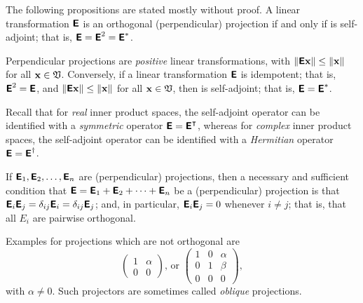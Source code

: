 The following propositions are stated mostly without proof.
A  linear transformation $\textsf{\textbf{E}}$ is an orthogonal (perpendicular) projection
if and only if is self-adjoint; that is,
$\textsf{\textbf{E}} = \textsf{\textbf{E}}^2=\textsf{\textbf{E}}^\ast $.

Perpendicular projections are {\em positive} linear transformations,
with
$\left\| \textsf{\textbf{E}}{\bf x} \right\| \le \| {\bf x} \|$
for all
${\bf x} \in {\frak V}$.
Conversely,
if a linear transformation $\textsf{\textbf{E}}$
is idempotent; that is,
$\textsf{\textbf{E}}^2=\textsf{\textbf{E}}$,
and  $\left\| \textsf{\textbf{E}}{\bf x} \right\| \le \| {\bf x} \|$
for all
${\bf x} \in {\frak V}$,
then  is self-adjoint; that is,
$\textsf{\textbf{E}}=\textsf{\textbf{E}}^\ast$.

Recall that
for {\em real} inner product spaces, the self-adjoint operator can be identified with a {\em symmetric} operator
$\textsf{\textbf{E}}=\textsf{\textbf{E}}^\intercal $,
whereas
for {\em complex} inner product spaces, the self-adjoint operator can be identified with a {\em Hermitian} operator
$\textsf{\textbf{E}}=\textsf{\textbf{E}}^\dagger$.


If $\textsf{\textbf{E}}_1,\textsf{\textbf{E}}_2, \ldots , \textsf{\textbf{E}}_n$ are (perpendicular)
projections,
then a necessary and sufficient condition that
$\textsf{\textbf{E}} =\textsf{\textbf{E}}_1+\textsf{\textbf{E}}_2+\cdots +\textsf{\textbf{E}}_n$
be a (perpendicular) projection is that
 $\textsf{\textbf{E}}_i \textsf{\textbf{E}}_j =\delta_{ij}\textsf{\textbf{E}}_i =\delta_{ij}\textsf{\textbf{E}}_j$;
and, in particular,
$\textsf{\textbf{E}}_i \textsf{\textbf{E}}_j =0$
whenever $i\neq j$; that is, that all $E_i$ are pairwise orthogonal.



{%
Examples for projections which are not orthogonal are
$$\begin{pmatrix}
1&\alpha \\
0&0
\end{pmatrix}
\text{,  or }
\begin{pmatrix}
1&0&\alpha \\
0&1&\beta \\
0&0&0
\end{pmatrix},$$
with $\alpha \neq 0$.
Such projectors are sometimes called
{\em oblique} projections.
}


